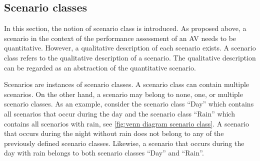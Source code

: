 \subsection{Scenario classes}
\label{sec:scenario classes}
In this section, the notion of scenario class is introduced. As proposed above, a scenario in the context of the performance assessment of an AV needs to be quantitative. However, a qualitative description of each scenario exists. 
\cbstart
A scenario class refers to the qualitative description of a scenario.
The qualitative description can be regarded as an abstraction of the quantitative scenario. 


Scenarios are instances of scenario classes. A scenario class can contain multiple scenarios. On the other hand, a scenario may belong to none, one, or multiple scenario classes. As an example, consider the scenario class ``Day'' which contains all scenarios that occur during the day and the scenario class ``Rain'' which contains all scenarios with rain, see \cref{fig:venn diagram scenario class}. A scenario that occurs during the night without rain does not belong to any of the previously defined scenario classes. Likewise, a scenario that occurs during the day with rain belongs to both scenario classes ``Day'' and ``Rain''. 


